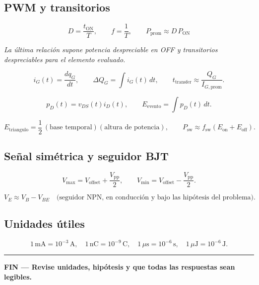 \documentclass[11pt, a4paper]{article}
\begin{document}
\subsection*{PWM y transitorios}

\[D=\frac{t_{\text{ON}}}{T},\qquad f=\frac{1}{T},\qquad P_{\text{prom}}\approx D\,P_{\text{ON}}\]

\noindent\textit{La última relación supone potencia despreciable en OFF y transitorios despreciables para el elemento evaluado.}

\[i_G(t)=\frac{dq_G}{dt},\qquad \Delta Q_G=\int i_G(t)\,dt,\qquad t_{\text{transfer}}\approx\frac{Q_G}{I_{G,\text{prom}}}.\]

\[p_D(t)=v_{DS}(t)i_D(t),\qquad E_{\text{evento}}=\int p_D(t)\,dt.\]

\[E_{\text{triangulo}}=\frac{1}{2}\,(\text{base temporal})(\text{altura de potencia}), \qquad P_{\text{sw}}\approx f_{\text{sw}}(E_{\text{on}}+E_{\text{off}}).\]

\subsection*{Señal simétrica y seguidor BJT}

\[V_{\max}=V_{\text{offset}}+\frac{V_{\text{pp}}}{2},\qquad V_{\min}=V_{\text{offset}}-\frac{V_{\text{pp}}}{2}.\]

\[V_{E}\approx V_B-V_{BE}\quad\text{(seguidor NPN, en conducción y bajo las hipótesis del problema).}\]

\subsection*{Unidades útiles}

\[1\,\mathrm{mA}=10^{-3}\,\mathrm{A},\quad 1\,\mathrm{nC}=10^{-9}\,\mathrm{C},\quad 1\,\mu\mathrm{s}=10^{-6}\,\mathrm{s},\quad 1\,\mu\mathrm{J}=10^{-6}\,\mathrm{J}.\]

\vfill
\noindent\rule{\linewidth}{0.4pt}
\begin{center}
\textbf{FIN — Revise unidades, hipótesis y que todas las respuestas sean legibles.}
\end{center}
\end{document}
